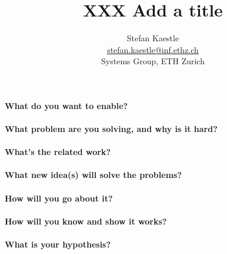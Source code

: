 \documentclass{article}
\begin{document}
\title{XXX Add a title}

\newcommand{\eaddr}{stefan.kaestle@inf.ethz.ch}
\newcommand{\email}{\href{mailto:\eaddr}{\eaddr}}

\author{Stefan Kaestle\\
  \email \\
  Systems Group, ETH Zurich}

\maketitle


\paragraph{What do you want to enable?}

\paragraph{What problem are you solving, and why is it hard?}

\paragraph{What's the related work?}

\paragraph{What new idea(s) will solve the problems?}

\paragraph{How will you go about it?}

\paragraph{How will you know and show it works?}

\paragraph{What is your hypothesis?}


\newpage



\label{LastPage}
\end{document}
